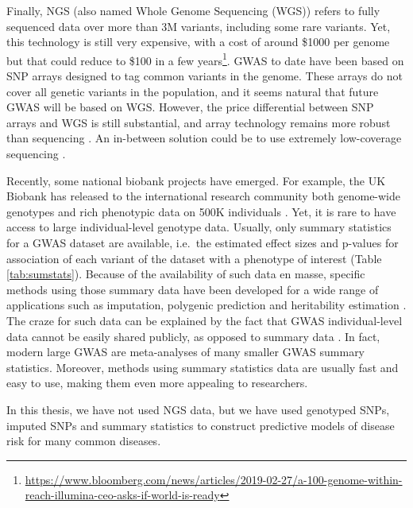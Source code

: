 Finally, NGS (also named Whole Genome Sequencing (WGS)) refers to fully sequenced data over more than 3M variants, including some rare variants. Yet, this technology is still very expensive, with a cost of around \$1000 per genome but that could reduce to \$100 in a few years\footnote{\url{https://www.bloomberg.com/news/articles/2019-02-27/a-100-genome-within-reach-illumina-ceo-asks-if-world-is-ready}}.
GWAS to date have been based on SNP arrays designed to tag common variants in the genome. These arrays do not cover all genetic variants in the population, and it seems natural that future GWAS will be based on WGS. However, the price differential between SNP arrays and WGS is still substantial, and array technology remains more robust than sequencing \cite[]{visscher201710}. An in-between solution could be to use extremely low-coverage sequencing \cite[]{pasaniuc2012extremely}.

Recently, some national biobank projects have emerged. For example, the UK Biobank has released to the international research community both genome-wide genotypes and rich phenotypic data on 500K individuals \cite[]{bycroft2017genome}.
Yet, it is rare to have access to large individual-level genotype data. 
Usually, only summary statistics for a GWAS dataset are available, i.e.\ the estimated effect sizes and p-values for association of each variant of the dataset with a phenotype of interest (Table \ref{tab:sumstats}). Because of the availability of such data en masse, specific methods using those summary data have been developed for a wide range of applications such as imputation, polygenic prediction and heritability estimation \cite[]{pasaniuc2014fast,vilhjalmsson2015modeling,bulik2015ld,pasaniuc2017dissecting,speed2018sumher}. The craze for such data can be explained by the fact that GWAS individual-level data cannot be easily shared publicly, as opposed to summary data \cite[]{lin2010meta}.
In fact, modern large GWAS are meta-analyses of many smaller GWAS summary statistics.
Moreover, methods using summary statistics data are usually fast and easy to use, making them even more appealing to researchers.

In this thesis, we have not used NGS data, but we have used genotyped SNPs, imputed SNPs and summary statistics to construct predictive models of disease risk for many common diseases.

